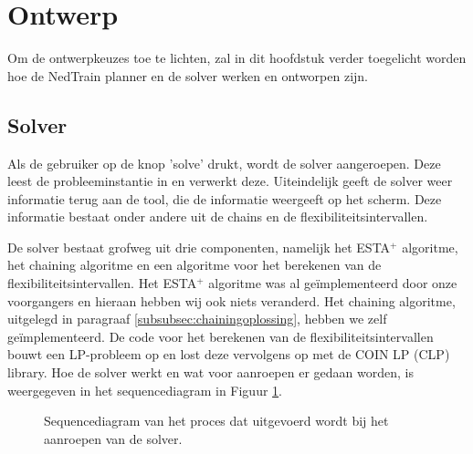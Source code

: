 \section{Ontwerp}
Om de ontwerpkeuzes toe te lichten, zal in dit hoofdstuk verder toegelicht worden hoe de NedTrain planner en de solver werken en ontworpen zijn.

\subsection{Solver}
Als de gebruiker op de knop 'solve' drukt, wordt de solver aangeroepen. Deze leest de probleeminstantie in en verwerkt deze. Uiteindelijk geeft de solver weer informatie terug aan de tool, die de informatie weergeeft op het scherm. Deze informatie bestaat onder andere uit de chains en de flexibiliteitsintervallen.

De solver bestaat grofweg uit drie componenten, namelijk het ESTA$^+$ algoritme, het chaining algoritme en een algoritme voor het berekenen van de flexibiliteitsintervallen. Het ESTA$^+$ algoritme was al ge\"implementeerd door onze voorgangers en hieraan hebben wij ook niets veranderd. Het chaining algoritme, uitgelegd in paragraaf \ref{subsubsec:chainingoplossing}, hebben we zelf ge\"implementeerd. De code voor het berekenen van de flexibiliteitsintervallen bouwt een LP-probleem op en lost deze vervolgens op met de COIN LP (CLP) library. Hoe de solver werkt en wat voor aanroepen er gedaan worden, is weergegeven in het sequencediagram in Figuur \ref{fig:sd}.

\newpage
\begin{figure}[H]
\centering
\label{fig:sd}

\caption{Sequencediagram van het proces dat uitgevoerd wordt bij het aanroepen van de solver.} 
\end{figure}

\newpage
